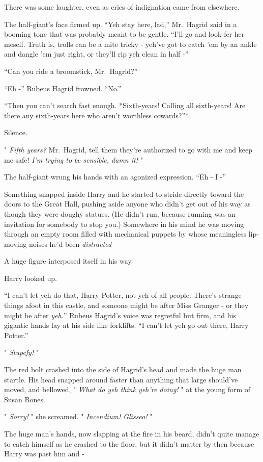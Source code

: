 There was some laughter, even as cries of indignation came from
elsewhere.

The half-giant's face firmed up. ``Yeh stay here, lad,'' Mr.~Hagrid said
in a booming tone that was probably meant to be gentle. ``I'll go and
look fer her meself. Truth is, trolls can be a mite tricky - yeh've got
to catch 'em by an ankle and dangle 'em just right, or they'll rip yeh
clean in half -''

``Can you ride a broomstick, Mr.~Hagrid?''

``Eh -'' Rubeus Hagrid frowned. ``No.''

``Then you can't search fast enough. *Sixth-years! Calling all
sixth-years! Are there any sixth-years here who aren't worthless
cowards?''*

Silence.

" \emph{Fifth years?} Mr.~Hagrid, tell them they're authorized to go
with me and keep me safe! \emph{I'm trying to be sensible, damn it!} "

The half-giant wrung his hands with an agonized expression. ``Eh - I -''

Something snapped inside Harry and he started to stride directly toward
the doors to the Great Hall, pushing aside anyone who didn't get out of
his way as though they were doughy statues. (He didn't run, because
running was an invitation for somebody to stop you.) Somewhere in his
mind he was moving through an empty room filled with mechanical puppets
by whose meaningless lip-moving noises he'd been \emph{distracted} -

A huge figure interposed itself in his way.

Harry looked up.

``I can't let yeh do that, Harry Potter, not yeh of all people. There's
strange things afoot in this castle, and someone might be after Miss
Granger - or they might be after \emph{yeh.}'' Rubeus Hagrid's voice was
regretful but firm, and his gigantic hands lay at his side like
forklifts. ``I can't let yeh go out there, Harry Potter.''

" \emph{Stupefy!} "

The red bolt crashed into the side of Hagrid's head and made the huge
man startle. His head snapped around faster than anything that large
should've moved, and bellowed, " \emph{What do yeh think yeh're doing!}
" at the young form of Susan Bones.

" \emph{Sorry!} " she screamed. " \emph{Incendium! Glisseo!} "

The huge man's hands, now slapping at the fire in his beard, didn't
quite manage to catch himself as he crashed to the floor, but it didn't
matter by then because Harry was past him and -

